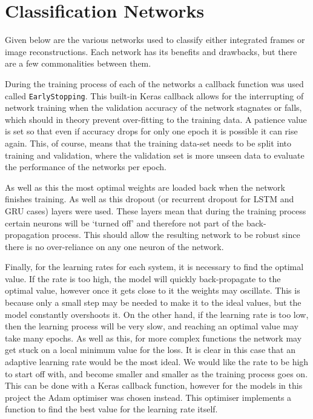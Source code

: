 \section{Classification Networks}

Given below are the various networks used to classify either integrated frames or image reconstructions. Each network has its benefits and drawbacks, but there are a few commonalities between them. 

During the training process of each of the networks a callback function was used called \lstinline{EarlyStopping}. This built-in Keras callback allows for the interrupting of network training when the validation accuracy of the network stagnates or falls, which should in theory prevent over-fitting to the training data. A patience value is set so that even if accuracy drops for only one epoch it is possible it can rise again. This, of course, means that the training data-set needs to be split into training and validation, where the validation set is more unseen data to evaluate the performance of the networks per epoch.

As well as this the most optimal weights are loaded back when the network finishes training. As well as this dropout (or recurrent dropout for LSTM and GRU cases) layers were used. These layers mean that during the training process certain neurons will be `turned off' and therefore not part of the back-propagation process. This should allow the resulting network to be robust since there is no over-reliance on any one neuron of the network.

Finally, for the learning rates for each system, it is necessary to find the optimal value. If the rate is too high, the model will quickly back-propagate to the optimal value, however once it gets close to it the weights may oscillate. This is because only a small step may be needed to make it to the ideal values, but the model constantly overshoots it. On the other hand, if the learning rate is too low, then the learning process will be very slow, and reaching an optimal value may take many epochs. As well as this, for more complex functions the network may get stuck on a local minimum value for the loss. It is clear in this case that an adaptive learning rate would be the most ideal. We would like the rate to be high to start off with, and become smaller and smaller as the training process goes on. This can be done with a Keras callback function, however for the models in this project the Adam optimiser\cite{Adam} was chosen instead. This optimiser implements a function to find the best value for the learning rate itself.

